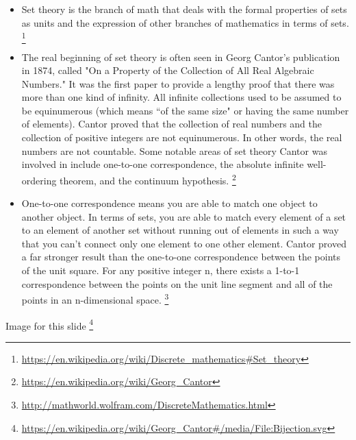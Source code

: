 \documentclass{amsart}
\theoremstyle{definition}
\theoremstyle{remark}
\numberwithin{equation}{section}
\begin{document}
\begin{itemize}
\item Set theory is the branch of math that deals with the formal properties of sets as units and the expression of other branches of mathematics in terms of sets.%
\footnote{\url{https://en.wikipedia.org/wiki/Discrete_mathematics#Set_theory}}%
\item The real beginning of set theory is often seen in Georg Cantor’s publication in 1874, called "On a Property of the Collection of All Real Algebraic Numbers." It was the first paper to provide a lengthy proof that there was more than one kind of infinity. All infinite collections used to be assumed to be equinumerous (which means “of the same size" or having the same number of elements). Cantor proved that the collection of real numbers and the collection of positive integers are not equinumerous. In other words, the real numbers are not countable. Some notable areas of set theory Cantor was involved in include one-to-one correspondence, the absolute infinite well-ordering theorem, and the continuum hypothesis.%
\footnote{\url{https://en.wikipedia.org/wiki/Georg_Cantor}}%
\end{itemize}

\begin{itemize}
\item One-to-one correspondence means you are able to match one object to another object. In terms of sets, you are able to match every element of a set to an element of another set without running out of elements in such a way that you can’t connect only one element to one other element. Cantor proved a far stronger result than the one-to-one correspondence between the points of the unit square. For any positive integer n, there exists a 1-to-1 correspondence between the points on the unit line segment and all of the points in an n-dimensional space.%
\footnote{\url{http://mathworld.wolfram.com/DiscreteMathematics.html}}%
\end{itemize}
Image for this slide%
\footnote{\url{https://en.wikipedia.org/wiki/Georg_Cantor#/media/File:Bijection.svg}}%
\end{document}
